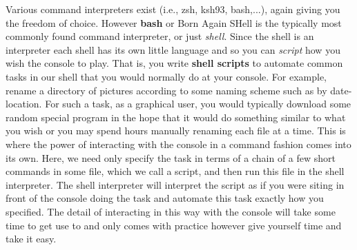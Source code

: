 Various command interpreters exist (i.e., zsh, ksh93, bash,...),
again giving you the freedom of choice. However \textbf{bash} or
Born Again SHell is the typically most commonly found command interpreter,
or just \emph{shell}. Since the shell is an interpreter each shell has
its own little language and so you can \emph{script} how you wish the
console to play. That is, you write \textbf{shell scripts} to automate
common tasks in our shell that you would normally do at your console.
For example, rename a directory of pictures according to some naming scheme
such as by date-location. For such a task, as a graphical user, you would
typically download some random special program in the hope that it would
do something similar to what you wish or you may spend hours manually
renaming each file at a time. This is where the power of interacting with
the console in a command fashion comes into its own. Here, we need only
specify the task in terms of a chain of a few short commands in some file,
which we call a script, and then run this file in the shell interpreter.
The shell interpreter will interpret the script as if you were siting in
front of the console doing the task and automate this task exactly how
you specified. The detail of interacting in this way with the console
will take some time to get use to and only comes with practice however
give yourself time and take it easy.
